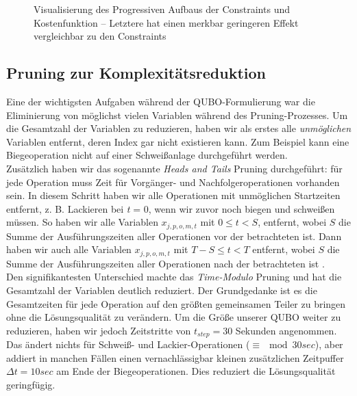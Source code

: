 \begin{figure}[H]
        \caption[ Ergebnisse nach Komplexität ]
         {\small Visualisierung des Progressiven Aufbaus der Constraints und Kostenfunktion -- Letztere hat einen merkbar geringeren Effekt vergleichbar zu den Constraints} 
        \label{fig:Results}
    \end{figure}



\subsection{Pruning zur Komplexitätsreduktion}
\label{subsec:pruning}
Eine der wichtigsten Aufgaben während der QUBO-Formulierung war die Eliminierung von möglichst vielen Variablen während des Pruning-Prozesses. Um die Gesamtzahl der Variablen zu reduzieren, haben wir als erstes alle \textit{unmöglichen} Variablen entfernt, deren Index gar nicht existieren kann\cite{Denkena2021}. Zum Beispiel kann eine Biegeoperation nicht auf einer Schweißanlage durchgeführt werden.\\
Zusätzlich haben wir das sogenannte \textit{Heads and Tails} \cite{Venturelli2016} Pruning durchgeführt: für jede Operation muss Zeit für Vorgänger- und Nachfolgeroperationen vorhanden sein. In diesem Schritt haben wir alle Operationen mit unmöglichen Startzeiten entfernt, z. B. Lackieren bei \textit{t} = 0, wenn wir zuvor noch biegen und schweißen müssen. So haben wir alle Variablen $x_{j,p,o,m,t}$ mit $0 \leq t<S$, entfernt, wobei $S$  die Summe der Ausführungszeiten aller Operationen vor der betrachteten ist. Dann haben wir auch alle Variablen $x_{j,p,o,m,t}$ mit  $T-S \leq t <T$ entfernt, wobei $S$ die Summe der Ausführungszeiten aller Operationen nach der betrachteten ist \cite{Kurowski2020}.\\
Den signifikantesten Unterschied machte das \textit{Time-Modulo} Pruning  und hat die Gesamtzahl der Variablen deutlich reduziert. Der Grundgedanke ist es die Gesamtzeiten für jede Operation auf den größten gemeinsamen Teiler zu bringen ohne die Lösungsqualität zu verändern.
Um die Größe unserer QUBO weiter zu reduzieren, haben wir jedoch Zeitstritte von $t_{step} = 30$ Sekunden angenommen. Das ändert nichts für Schweiß- und Lackier-Operationen ($\equiv  \mod  30 sec $), aber addiert in manchen Fällen einen vernachlässigbar kleinen zusätzlichen Zeitpuffer $\Delta t = 10 sec$ am Ende der Biegeoperationen. Dies reduziert die Lösungsqualität geringfügig.

